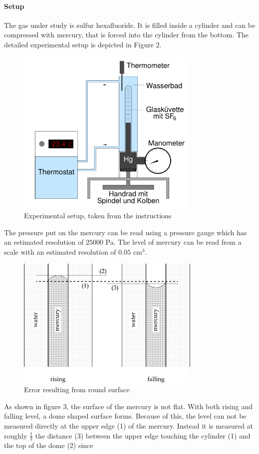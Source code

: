 \documentclass[10pt,a4paper]{article}
\begin{document}
\paragraph{Setup}
The gas under study is sulfur hexafluoride. It is filled inside a cylinder and can be compressed with mercury, that is forced into the cylinder from the bottom. The detailed experimental setup is depicted in Figure 2.
\begin{figure}[hbt!]
\includegraphics[width=250pt, center]{versuchsaufbau.png}
\caption{Experimental setup, taken from the instructions \cite{instructions}}
\label{fig:length_eight_mouse}
\end{figure}
The pressure put on the mercury can be read using a pressure gauge which has an estimated resolution of $25000$ Pa. The level of mercury can be read from a scale with an estimated resolution of $0.05$ cm$^3$.
\begin{figure}[hbt!]
\includegraphics[width=250pt, center]{MessrohrAbweichung.png}
\caption{Error resulting from round surface}
\label{fig:length_eight_mouse}
\end{figure}
As shown in figure 3, the surface of the mercury is not flat. With both rising and falling level, a dome shaped surface forms. Because of this, the level can not be measured directly at the upper edge (1) of the mercury. Instead it is measured at roughly $\frac{1}{3}$ the distance (3) between the upper edge touching the cylinder (1) and the top of the dome (2) since 
\end{document}
